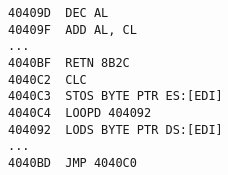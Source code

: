 \begin{enumerate}
{\begin{itemize}
{\begin{lstlisting}[captionpos=b,caption={Kỹ thuật Overlapping block sử dụng trong packer YODA},label={lst:OBinYODA},frame=single]
40409D	DEC AL
40409F	ADD AL, CL
...
4040BF	RETN 8B2C		
4040C2	CLC
4040C3	STOS BYTE PTR ES:[EDI]
4040C4	LOOPD 404092
404092	LODS BYTE PTR DS:[EDI]
...		
4040BD	JMP 4040C0
\end{lstlisting}
}
\end{itemize}
}
\end{enumerate}


